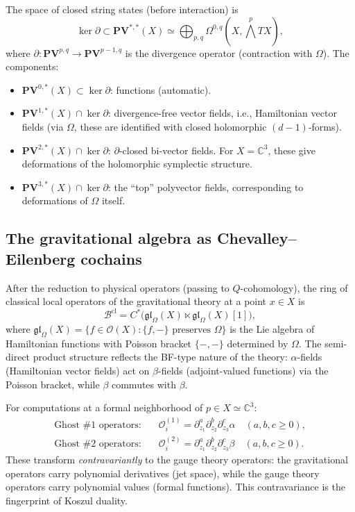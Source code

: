 \documentclass[11pt]{article}
\theoremstyle{definition}
\theoremstyle{remark}
\newcommand{\cB}{\mathcal{B}}
\newcommand{\cO}{\mathcal{O}}
\newcommand{\frakgl}{\mathfrak{gl}}
\begin{document}
The space of closed string states (before interaction) is
\[
 \ker \partial \subset \mathbf{PV}^{*,*}(X) \simeq
 \bigoplus_{p,q} \Omega^{0,q}(X, \bigwedge^p TX),
\]
where $\partial \colon \mathbf{PV}^{p,q} \to \mathbf{PV}^{p-1,q}$ is the
divergence operator (contraction with $\Omega$). The components:
\begin{itemize}
 \item $\mathbf{PV}^{0,*}(X) \subset \ker \partial$: functions (automatic).
 \item $\mathbf{PV}^{1,*}(X) \cap \ker \partial$: divergence-free vector
 fields, i.e., Hamiltonian vector fields (via $\Omega$, these are identified
 with closed holomorphic $(d-1)$-forms).
 \item $\mathbf{PV}^{2,*}(X) \cap \ker \partial$: $\partial$-closed
 bi-vector fields. For $X = \mathbb{C}^3$, these give deformations of the
 holomorphic symplectic structure.
 \item $\mathbf{PV}^{3,*}(X) \cap \ker \partial$: the ``top'' polyvector
 fields, corresponding to deformations of $\Omega$ itself.
\end{itemize}

\subsection{The gravitational algebra as Chevalley--Eilenberg cochains}
\label{sec:grav-ce}

After the reduction to physical operators (passing to $Q$-cohomology), the
ring of classical local operators of the gravitational theory at a point
$x \in X$ is
\[
 \cB^{\mathrm{cl}}
 = C^*\bigl(\frakgl_\Omega(X) \ltimes \frakgl_\Omega(X)[1]\bigr),
\]
where $\frakgl_\Omega(X) = \{f \in \cO(X) : \{f, -\} \text{ preserves }
\Omega\}$ is the Lie algebra of Hamiltonian functions with Poisson bracket
$\{-,-\}$ determined by $\Omega$. The semi-direct product structure reflects
the BF-type nature of the theory: $\alpha$-fields (Hamiltonian vector fields)
act on $\beta$-fields (adjoint-valued functions) via the Poisson bracket, while
$\beta$ commutes with $\beta$.

For computations at a formal neighborhood of $p \in X \simeq \mathbb{C}^3$:
\begin{align*}
 \text{Ghost \#1 operators:} &\quad
 \cO_i^{(1)} = \partial_{z_1}^{a} \partial_{z_2}^{b} \partial_{z_3}^{c}
 \alpha \quad (a, b, c \geq 0), \\
 \text{Ghost \#2 operators:} &\quad
 \cO_i^{(2)} = \partial_{z_1}^{a} \partial_{z_2}^{b} \partial_{z_3}^{c}
 \beta \quad (a, b, c \geq 0).
\end{align*}
These transform \emph{contravariantly} to the gauge theory operators: the
gravitational operators carry polynomial derivatives (jet space), while the
gauge theory operators carry polynomial values (formal functions). This
contravariance is the fingerprint of Koszul duality.
\end{document}
